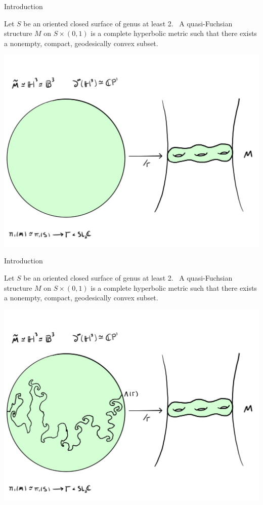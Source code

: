 \documentclass[professionalfont]{beamer}
\begin{document}



\begin{frame}{Introduction}

Let $S$ be an oriented closed surface of genus at least 2.  \ A quasi-Fuchsian structure $M$ on $S \times (0,1)$ is a complete hyperbolic metric such that there exists a nonempty, compact, geodesically convex subset.


\centering\includegraphics[scale=0.09]{QF-4.jpg}
	


\end{frame}





\begin{frame}{Introduction}

Let $S$ be an oriented closed surface of genus at least 2.  \ A quasi-Fuchsian structure $M$ on $S \times (0,1)$ is a complete hyperbolic metric such that there exists a nonempty, compact, geodesically convex subset.


\centering\includegraphics[scale=0.09]{QF-5.jpg}
	


\end{frame}
\end{document}
